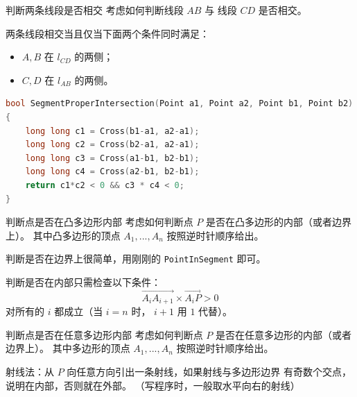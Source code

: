 \documentclass{beamer}
\begin{document}
\begin{frame}[fragile]{判断两条线段是否相交}
    \small
    考虑如何判断线段 $AB$ 与 线段 $CD$ 是否相交。

    \vspace{1em}\pause
    两条线段相交当且仅当下面两个条件同时满足：
    \begin{itemize}
        \item $A,B$ 在 $l_{CD}$ 的两侧；
        \item $C,D$ 在 $l_{AB}$ 的两侧。
    \end{itemize}

    \vspace{1em}\pause
    \begin{lstlisting}[language=c++]
bool SegmentProperIntersection(Point a1, Point a2, Point b1, Point b2)
{
    long long c1 = Cross(b1-a1, a2-a1);
    long long c2 = Cross(b2-a1, a2-a1);
    long long c3 = Cross(a1-b1, b2-b1);
    long long c4 = Cross(a2-b1, b2-b1);
    return c1*c2 < 0 && c3 * c4 < 0;
}
    \end{lstlisting}
\end{frame}

\begin{frame}[fragile]{判断点是否在凸多边形内部}
    \small
    考虑如何判断点 $P$ 是否在凸多边形的内部（或者边界上）。
    其中凸多边形的顶点 $A_1,...,A_n$ 按照逆时针顺序给出。

    \vspace{1em}\pause
    判断是否在边界上很简单，用刚刚的 \verb|PointInSegment| 即可。

    \vspace{1em}\pause
    判断是否在内部只需检查以下条件：
    \begin{equation}
        \overrightarrow{A_iA_{i+1}}\times  \overrightarrow{A_iP}>0
    \end{equation}
    对所有的 $i$ 都成立（当 $i=n$ 时， $i+1$ 用 $1$ 代替）。
\end{frame}

\begin{frame}{判断点是否在任意多边形内部}
    \small
    考虑如何判断点 $P$ 是否在任意多边形的内部（或者边界上）。
    其中多边形的顶点 $A_1,...,A_n$ 按照逆时针顺序给出。

    \vspace{1em}\pause
    射线法：从 $P$ 向任意方向引出一条射线，如果射线与多边形边界
    有奇数个交点，说明在内部，否则就在外部。
    （写程序时，一般取水平向右的射线）
\end{frame}
\end{document}
